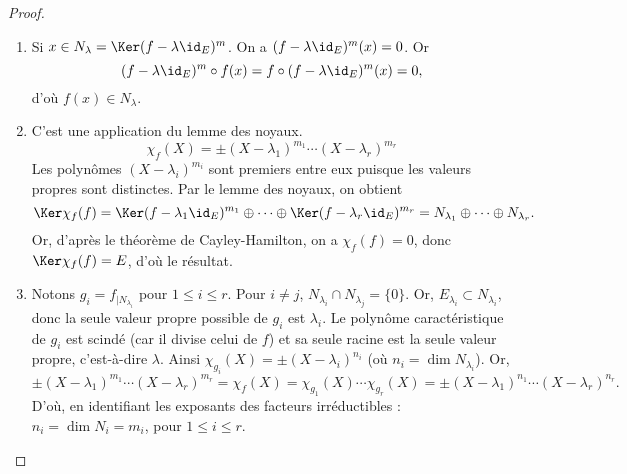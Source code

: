 \documentclass[12pt, class=report,crop=false]{standalone}
\begin{document}
\begin{proof}~
\begin{enumerate}
  \item Si $x \in N_\lambda = \Ker (f-\lambda \id_E)^m$.
  On a $(f-\lambda\id_E)^{m}(x)=0$. Or 
$$(f-\lambda\id_E)^{m}\circ f(x)=f\circ(f-\lambda\id_E)^{m}(x)=0,$$
d'où $f(x)\in N_\lambda$.

  \item C'est une application du lemme des noyaux.
$$\chi_f(X)=\pm(X-\lambda_1)^{m_1}\cdots(X-\lambda_r)^{m_r}$$
Les polynômes $(X-\lambda_i)^{m_i}$ sont premiers entre eux puisque 
les valeurs propres sont distinctes. Par le lemme des noyaux, on obtient
$$\Ker \chi_f(f) 
= \Ker (f-\lambda_1\id_E)^{m_1} \oplus \cdots \oplus \Ker (f-\lambda_r\id_E)^{m_r}
= N_{\lambda_1} \oplus\cdots\oplus N_{\lambda_r}.$$
Or, d'après le théorème de Cayley-Hamilton, on a $\chi_f(f)=0$, donc $\Ker \chi_f(f)=E$, 
d'où le résultat.
 
  \item Notons $g_i=f_{|N_{\lambda_i}}$ pour $1\le i \le r$. 
  Pour $i\neq j$, $N_{\lambda_i}\cap N_{\lambda_j}=\{0\}$. Or, $E_{\lambda_i}\subset N_{\lambda_i}$, 
  donc la seule valeur propre possible de $g_i$ est $\lambda_i$. 
  Le polynôme caractéristique de $g_i$ est scindé (car il divise celui de $f$) et sa seule racine est la seule valeur propre, c'est-à-dire $\lambda$. 
  Ainsi $\chi_{g_i}(X)= \pm(X-\lambda_i)^{n_i}$ (où $n_i = \dim N_{\lambda_i}$). 
   Or,
$$\pm(X-\lambda_1)^{m_1}\cdots(X-\lambda_r)^{m_r} = \chi_f(X) 
= \chi_{g_1}(X)\cdots \chi_{g_r}(X) = \pm (X-\lambda_1)^{n_1}\cdots(X-\lambda_r)^{n_r}.$$
D'où, en identifiant les exposants des facteurs irréductibles : $n_i=\dim N_i=m_i$, pour $1\le i\le r$.
\end{enumerate}
\end{proof}
\end{document}
